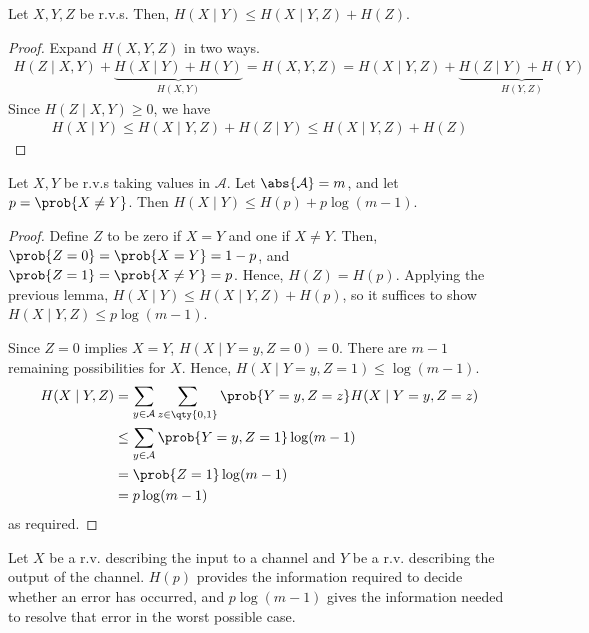 \begin{lemma}
    Let $X, Y, Z$ be r.v.s.
    Then, $H(X \mid Y) \leq H(X \mid Y, Z) + H(Z)$.
\end{lemma}

\begin{proof}
    Expand $H(X,Y,Z)$ in two ways.
    \begin{align*}
        H(Z \mid X,Y) + \underbrace{H(X\mid Y) + H(Y)}_{H(X,Y)} = H(X,Y,Z) = H(X \mid Y,Z) + \underbrace{H(Z \mid Y) + H(Y)}_{H(Y,Z)}
    \end{align*}
    Since $H(Z \mid X,Y) \geq 0$, we have
    \begin{align*}
        H(X \mid Y) \leq H(X \mid Y,Z) + H(Z \mid Y) \leq H(X \mid Y,Z) + H(Z)
    \end{align*}
\end{proof}

\begin{proposition}
    Let $X, Y$ be r.v.s taking values in $\mathcal A$.
    Let $\abs{\mathcal A} = m$, and let $p = \prob{X \neq Y}$.
    Then $H(X \mid Y) \leq H(p) + p \log(m-1)$.
\end{proposition}

\begin{proof}
    Define $Z$ to be zero if $X = Y$ and one if $X \neq Y$.
    Then, $\prob{Z = 0} = \prob{X = Y} = 1 - p$, and $\prob{Z = 1} = \prob{X \neq Y} = p$.
    Hence, $H(Z) = H(p)$.
    Applying the previous lemma, $H(X \mid Y) \leq H(X \mid Y, Z) + H(p)$, so it suffices to show $H(X \mid Y, Z) \leq p\log(m-1)$.

    Since $Z = 0$ implies $X = Y$, $H(X \mid Y = y, Z = 0) = 0$.
    There are $m - 1$ remaining possibilities for $X$.
    Hence, $H(X \mid Y = y, Z = 1) \leq \log(m-1)$.
    \begin{align*}
        H(X \mid Y, Z) &= \sum_{y \in \mathcal A} \sum_{z \in \qty{0,1}} \prob{Y = y, Z = z} H(X \mid Y = y, Z = z) \\
        &\leq \sum_{y \in \mathcal A} \prob{Y = y, Z = 1} \log(m-1) \\
        &= \prob{Z = 1} \log (m-1) \\
        &= p\log(m-1)
    \end{align*}
    as required.
\end{proof}

Let $X$ be a r.v. describing the input to a channel and $Y$ be a r.v. describing the output of the channel.
$H(p)$ provides the information required to decide whether an error has occurred, and $p\log(m-1)$ gives the information needed to resolve that error in the worst possible case.

